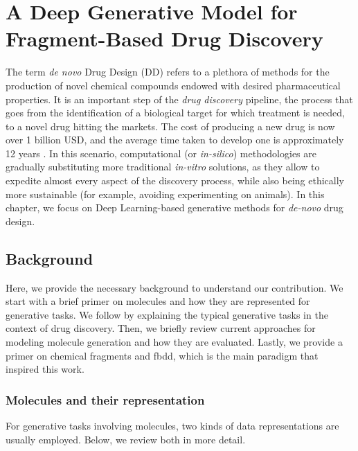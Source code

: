 \chapter{A Deep Generative Model for Fragment-Based Drug Discovery} %
\label{ch:deep-generative-learning-drug-discovery}
The term \emph{de novo} Drug Design (DD) refers to a plethora of methods for the production of novel chemical compounds endowed with desired pharmaceutical properties. It is an important step of the \emph{drug discovery} pipeline, the process that goes from the identification of a biological target for which treatment is needed, to a novel drug hitting the markets. The cost of producing a new drug is now over 1 billion USD, and the average time taken to develop one is approximately 12 years \citep{dimasi2016drugdiscoverycost}. In this scenario, computational (or \emph{in-silico}) methodologies are gradually substituting more traditional \emph{in-vitro} solutions, as they allow to expedite almost every aspect of the discovery process, while also being ethically more sustainable (for example, avoiding experimenting on animals). In this chapter, we focus on Deep Learning-based generative methods for \emph{de-novo} drug design.

\section{Background}
Here, we provide the necessary background to understand our contribution. We start with a brief primer on molecules and how they are represented for generative tasks. We follow by explaining the typical generative tasks in the context of drug discovery. Then, we briefly review current approaches for modeling molecule generation and how they are evaluated. Lastly, we provide a primer on chemical fragments and \gls{fbdd}, which is the main paradigm that inspired this work.

\subsection{Molecules and their representation}
For generative tasks involving molecules, two kinds of data representations are usually employed. Below, we review both in more detail.

